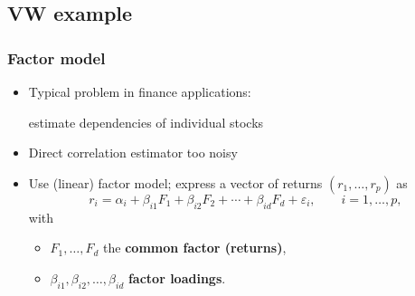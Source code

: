 \documentclass[xcolor=table,10pt]{beamer}
\begin{document}


\subsection{VW example}

\begin{frame}
  \frametitle{Factor model}
  \begin{itemize}
  \item Typical problem in finance applications:
    \begin{center}
      \alert{estimate dependencies of individual stocks}
    \end{center}
  \item Direct correlation estimator too noisy

  \item Use \alert{(linear) factor model}; express a vector of returns
    $(r_1, \ldots, r_p)$ as
    \begin{equation*}
      r_i=\alpha_i + \beta_{i1} F_1 + \beta_{i2} F_2 + \cdots + \beta_{id}
      F_d + \varepsilon_i, \qquad i=1,\ldots, p,
    \end{equation*}
    with
    \begin{itemize}
      \addtolength{\itemsep}{2pt}
    \item $F_1, \ldots, F_d$ the {\bf common factor (returns)},
    \item $\beta_{i1}, \beta_{i2}, \ldots, \beta_{id}$ {\bf
        factor loadings}.
    \end{itemize}
  \end{itemize}
\end{frame}
\end{document}
